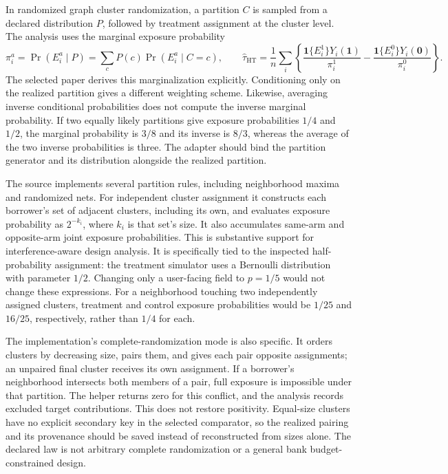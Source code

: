 In randomized graph cluster randomization, a partition $C$ is sampled from a declared distribution $P$, followed by treatment assignment at the cluster level. The analysis uses the marginal exposure probability
\[
 \pi_i^a=\Pr(E_i^a\mid P)=\sum_c P(c)\Pr(E_i^a\mid C=c),
 \qquad
 \widehat\tau_{\mathrm{HT}}=
 \frac{1}{n}\sum_i\left\{
 \frac{\mathbf{1}\{E_i^1\}Y_i(\mathbf{1})}{\pi_i^1}
 -\frac{\mathbf{1}\{E_i^0\}Y_i(\mathbf{0})}{\pi_i^0}
 \right\}.
\]
The selected paper derives this marginalization explicitly. Conditioning only on the realized partition gives a different weighting scheme. Likewise, averaging inverse conditional probabilities does not compute the inverse marginal probability. If two equally likely partitions give exposure probabilities $1/4$ and $1/2$, the marginal probability is $3/8$ and its inverse is $8/3$, whereas the average of the two inverse probabilities is three. The adapter should bind the partition generator and its distribution alongside the realized partition.~\citep{exec25_cnet_paper,exec25_cnet_choice}

The source implements several partition rules, including neighborhood maxima and randomized nets. For independent cluster assignment it constructs each borrower's set of adjacent clusters, including its own, and evaluates exposure probability as $2^{-k_i}$, where $k_i$ is that set's size. It also accumulates same-arm and opposite-arm joint exposure probabilities. This is substantive support for interference-aware design analysis. It is specifically tied to the inspected half-probability assignment: the treatment simulator uses a Bernoulli distribution with parameter $1/2$. Changing only a user-facing field to $p=1/5$ would not change these expressions. For a neighborhood touching two independently assigned clusters, treatment and control exposure probabilities would be $1/25$ and $16/25$, respectively, rather than $1/4$ for each.~\citep{exec25_cnet_rgcr,exec25_cnet_choice}

The implementation's complete-randomization mode is also specific. It orders clusters by decreasing size, pairs them, and gives each pair opposite assignments; an unpaired final cluster receives its own assignment. If a borrower's neighborhood intersects both members of a pair, full exposure is impossible under that partition. The helper returns zero for this conflict, and the analysis records excluded target contributions. This does not restore positivity. Equal-size clusters have no explicit secondary key in the selected comparator, so the realized pairing and its provenance should be saved instead of reconstructed from sizes alone. The declared law is not arbitrary complete randomization or a general bank budget-constrained design.~\citep{exec25_cnet_rgcr,exec25_cnet_choice}

